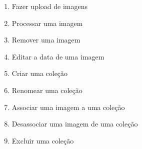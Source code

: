 \begin{enumerate}[parsep=0pt,itemsep=0pt]
    \item Fazer upload de imagens
    \item Processar uma imagem
    \item Remover uma imagem
    \item Editar a data de uma imagem
    \item Criar uma coleção
    \item Renomear uma coleção
    \item Associar uma imagem a uma coleção
    \item Desassociar uma imagem de uma coleção
    \item Excluir uma coleção
\end{enumerate}